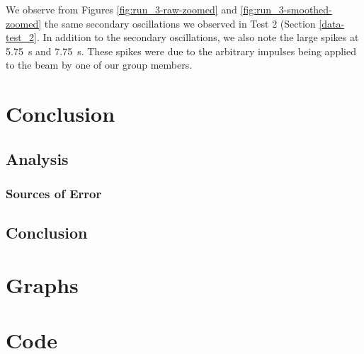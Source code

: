 \documentclass[12 pt]{report}
\begin{document}
We observe from Figures \ref{fig:run_3-raw-zoomed} and \ref{fig:run_3-smoothed-zoomed} the same secondary oscillations we observed in Test 2 (Section \ref{data-test_2}. In addition to the secondary oscillations, we also note the large spikes at \qty{5.75}{\s} and \qty{7.75}{\s}. These spikes were due to the arbitrary impulses being applied to the beam by one of our group members.

\chapter{Conclusion} \label{conclusion-chapter}
\section{Analysis} \label{analysis}




\subsection{Sources of Error} \label{analysis-sources_of_error}


\section{Conclusion} \label{conclusion-section}


\printbibliography[heading=subbibintoc]

\appendix
\chapter{Graphs} \label{graphs}


\chapter{Code} \label{code}
\end{document}

